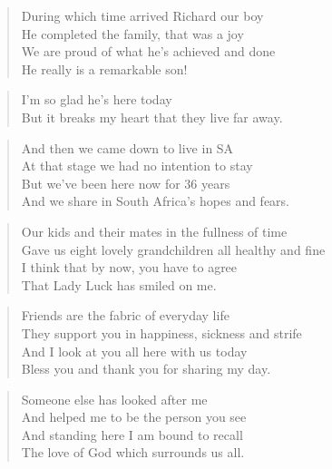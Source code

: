 \begin{verse}
During which time arrived Richard our boy \\
He completed the family, that was a joy \\
We are proud of what he's achieved and done \\
He really is a remarkable son! \\
\end{verse}

\begin{verse}
I'm so glad he's here today \\
But it breaks my heart that they live far away. \\
\end{verse}

\begin{verse}
And then we came down to live in SA \\
At that stage we had no intention to stay \\
But we've been here now for 36 years \\
And we share in South Africa's hopes and fears. \\
\end{verse}

\begin{verse}
Our kids and their mates in the fullness of time \\
Gave us eight lovely grandchildren all healthy and fine \\
I think that by now, you have to agree \\
That Lady Luck has smiled on me. \\
\end{verse}

\begin{verse}
Friends are the fabric of everyday life \\
They support you in happiness, sickness and strife \\
And I look at you all here with us today \\
Bless you and thank you for sharing my day. \\
\end{verse}

\begin{verse}
Someone else has looked after me \\
And helped me to be the person you see \\
And standing here I am bound to recall \\
The love of God which surrounds us all. \\
\end{verse}

\clearpage
\thispagestyle{empty}
